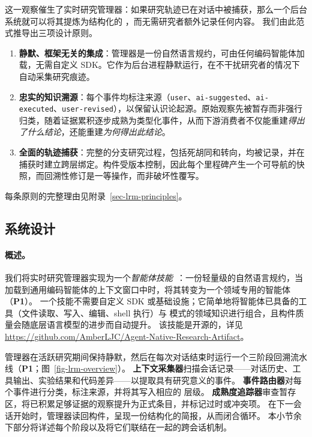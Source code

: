 这一观察催生了实时研究管理器：如果研究轨迹已在对话中被捕获，那么一个后台系统就可以将其提炼为结构化的 \ara{}，而无需研究者额外记录任何内容。
我们由此范式推导出三项设计原则。

\begin{enumerate}[label=\textbf{P\arabic*.}, leftmargin=2em, itemsep=1pt]
    \item \textbf{静默、框架无关的集成}：管理器是一份自然语言规约，可由任何编码智能体加载，无需自定义 SDK。它作为后台进程静默运行，在不干扰研究者的情况下自动采集研究痕迹。
    \item \textbf{忠实的知识溯源}：每个事件均标注来源（\texttt{user}、\texttt{ai-suggested}、\texttt{ai-executed}、\texttt{user-revised}），以保留认识论起源。原始观察先被暂存而非强行归类，随着证据累积逐步成熟为类型化事件，从而下游消费者不仅能重建\emph{得出了什么结论}，还能重建\emph{为何得出此结论}。
    \item \textbf{全面的轨迹捕获}：完整的分支研究过程，包括死胡同和转向，均被记录，并在捕获时建立跨层绑定。构件受版本控制，因此每个里程碑产生一个可导航的快照，而回溯性修订是一等操作，而非破坏性覆写。
\end{enumerate}
\noindent 每条原则的完整理由见附录~\ref{sec-lrm-principles}。

\subsection{系统设计}
\label{sec-lrm-design}

\paragraph{概述。}
我们将实时研究管理器实现为一个\emph{智能体技能}~\cite{agentskills2025}：一份轻量级的自然语言规约，当加载到通用编码智能体的上下文窗口中时，将其转变为一个领域专用的智能体（\textbf{P1}）。
一个技能不需要自定义 SDK 或基础设施；它简单地将智能体已具备的工具（文件读取、写入、编辑、shell 执行）与 \ara{} 模式的领域知识进行组合，且构件质量会随底层语言模型的进步而自动提升。
该技能是开源的，详见 \url{https://github.com/AmberLJC/Agent-Native-Research-Artifact}。

管理器在活跃研究期间保持静默，然后在每次对话结束时运行一个三阶段回溯流水线（\textbf{P1}；图~\ref{fig-lrm-overview}）。
\textbf{上下文采集器}扫描会话记录——对话历史、工具输出、实验结果和代码差异——以提取具有研究意义的事件。
\textbf{事件路由器}对每个事件进行分类，标注来源，并将其写入相应的 \ara{} 层级。
\textbf{成熟度追踪器}审查暂存区，将已积累足够证据的观察提升为正式条目，并标记过时或冲突项。
在下一会话开始时，管理器读回构件，呈现一份结构化的简报，从而闭合循环。
本小节余下部分将详述每个阶段以及将它们联结在一起的跨会话机制。


